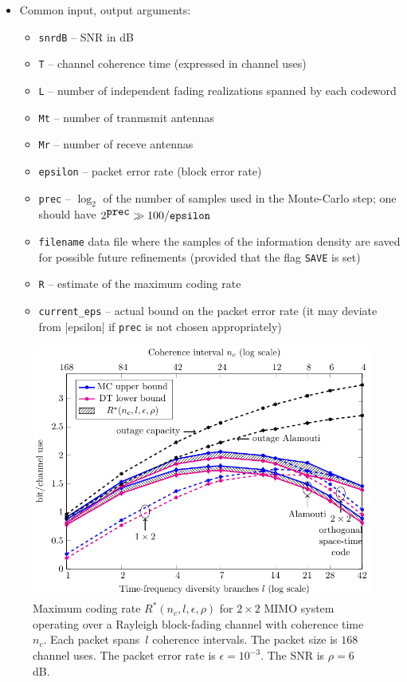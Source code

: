 \documentclass[a4paper,11p]{memoir}
\begin{document}
\begin{itemize}
  
  \item Common input, output arguments: 
  \begin{itemize}
    \item \verb|snrdB| -- SNR in dB
    \item \verb|T| -- channel coherence time (expressed in channel uses)
    \item \verb|L| -- number of independent fading realizations spanned by each codeword
    \item \verb|Mt| -- number of tranmsmit antennas
    \item \verb|Mr| -- number of receve antennas
    \item \verb|epsilon| -- packet error rate (block error rate)
    \item \verb|prec| -- $\log_2$ of the number of samples used in the Monte-Carlo step; one should have $2^{\verb|prec|} \gg 100 / \verb|epsilon|$
    \item \verb|filename| data file where the samples of the information density are saved for possible future refinements (provided that the flag \verb|SAVE| is set)
    \item \verb|R| -- estimate of the maximum coding rate
    \item \verb|current_eps| -- actual bound on the packet error rate (it may  deviate from |epsilon| if \verb|prec| is not chosen appropriately)
  \end{itemize}
  
\end{itemize}

   \begin{figure}[t]
    \centering
      \includegraphics[width=.9\textwidth]{./plots/snr6eps03M2}
    \caption{Maximum coding rate $R^\ast(n_c,l,\epsilon,\rho)$ for $2\times 2$ MIMO system operating over a Rayleigh block-fading channel with coherence time $n_c$.
    Each packet spans~$l$ coherence intervals. The packet size is $168$ channel uses. The packet error rate is $\epsilon=10^{-3}$.
    The SNR is $\rho=6$ dB.}
    \label{fig:snr6eps03M2}
  \end{figure}
  
\end{document}
